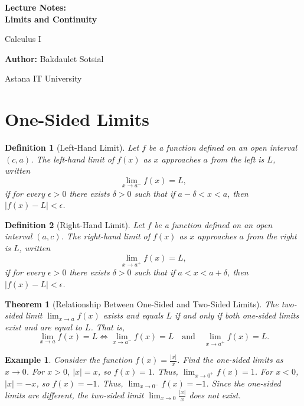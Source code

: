 \documentclass[11pt,a4paper]{article}
\newtheorem{example}{Example}
\newtheorem{theorem}{Theorem}
\newtheorem{definition}{Definition}
\begin{document}
\begin{titlepage}
\centering
\vspace*{4cm}
{\Huge\bfseries Lecture Notes:\\ Limits and Continuity\par}
\vspace{1cm}
{\Large Calculus I\par}
\vspace{2cm}
{\large \textbf{Author:} Bakdaulet Sotsial\par}
\vspace{1cm}
\vfill
{\small Astana IT University \par}
\vspace*{2cm}
\end{titlepage}
\tableofcontents
\newpage
\section{One-Sided Limits}
\begin{definition}[Left-Hand Limit]
Let $f$ be a function defined on an open interval $(c, a)$. The \textit{left-hand limit} of $f(x)$ as $x$ approaches $a$ from the left is $L$, written
\[
\lim_{x \to a^-} f(x) = L,
\]
if for every $\epsilon > 0$ there exists $\delta > 0$ such that if $a - \delta < x < a$, then $|f(x) - L| < \epsilon$.
\end{definition}
\begin{definition}[Right-Hand Limit]
Let $f$ be a function defined on an open interval $(a, c)$. The \textit{right-hand limit} of $f(x)$ as $x$ approaches $a$ from the right is $L$, written
\[
\lim_{x \to a^+} f(x) = L,
\]
if for every $\epsilon > 0$ there exists $\delta > 0$ such that if $a < x < a + \delta$, then $|f(x) - L| < \epsilon$.
\end{definition}
\begin{theorem}[Relationship Between One-Sided and Two-Sided Limits]
The two-sided limit $\displaystyle \lim_{x \to a} f(x)$ exists and equals $L$ if and only if both one-sided limits exist and are equal to $L$. That is,
\[
\lim_{x \to a} f(x) = L \iff \lim_{x \to a^-} f(x) = L \quad \text{and} \quad \lim_{x \to a^+} f(x) = L.
\]
\end{theorem}
\begin{example}
Consider the function $f(x) = \frac{|x|}{x}$. Find the one-sided limits as $x \to 0$.
For $x > 0$, $|x| = x$, so $f(x) = 1$. Thus, $\lim_{x \to 0^+} f(x) = 1$.
For $x < 0$, $|x| = -x$, so $f(x) = -1$. Thus, $\lim_{x \to 0^-} f(x) = -1$.
Since the one-sided limits are different, the two-sided limit $\lim_{x \to 0} \frac{|x|}{x}$ does not exist.
\end{example}
\end{document}
